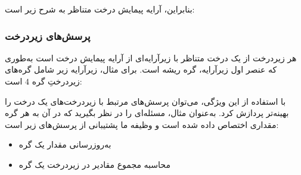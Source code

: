 بنابراین، آرایه پیمایش درخت متناظر به شرح زیر است:
\begin{center}
\end{center}

\subsubsection{پرسش‌های زیردرخت}

هر زیردرخت از یک درخت متناظر با زیرآرایه‌ای
از آرایه پیمایش درخت است به‌طوری که
عنصر اول زیرآرایه، گره ریشه است.
برای مثال، زیرآرایه زیر شامل گره‌های
زیردرختِ گره $4$ است:
\begin{center}
\end{center}
با استفاده از این ویژگی، می‌توان پرسش‌های
مرتبط با زیردرخت‌های یک درخت را بهینه‌تر پردازش کرد.
به‌عنوان مثال، مسئله‌ای را در نظر بگیرید که در آن به هر گره
مقداری اختصاص داده شده است و وظیفه ما پشتیبانی
از پرسش‌های زیر است:
\begin{itemize}
\item به‌روزرسانی مقدار یک گره
\item محاسبه مجموع مقادیر در زیردرخت یک گره
\end{itemize}

